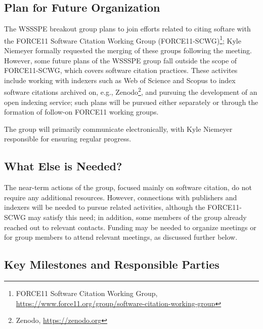 \subsection{Plan for Future Organization}

The WSSSPE breakout group plans to join efforts related to citing softare with the FORCE11 Software Citation Working Group (FORCE11-SCWG)\footnote{FORCE11 Software Citation Working Group, \url{https://www.force11.org/group/software-citation-working-group}}; Kyle Niemeyer formally requested the merging of these groups following the meeting.
However, some future plans of the WSSSPE group fall outside the scope of FORCE11-SCWG, which covers software citation practices.
These activites include working with indexers such as Web of Science and Scopus to index software citations archived on, e.g., Zenodo\footnote{Zenodo, \url{https://zenodo.org}}, and pursuing the development of an open indexing service; such plans will be pursued either separately or through the formation of follow-on FORCE11 working groups.

The group will primarily communicate electronically, with Kyle Niemeyer responsible for ensuring regular progress.

\subsection{What Else is Needed?}

The near-term actions of the group, focused mainly on software citation, do not require any additional resources.
However, connections with publishers and indexers will be needed to pursue related activities, although the FORCE11-SCWG may satisfy this need; in addition, some members of the group already reached out to relevant contacts.
Funding may be needed to organize meetings or for group members to attend relevant meetings, as discussed further below.

\subsection{Key Milestones and Responsible Parties}

